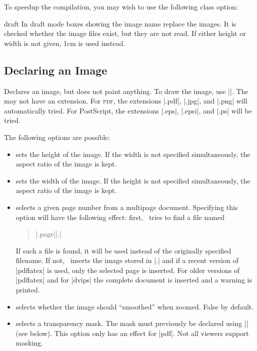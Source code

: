 To speedup the compilation, you may wish to use the following class
option:
\begin{packageoption}{draft}
  In draft mode boxes showing the image name replace the
  images. It is checked whether the image files exist, but they are
  not read. If either height or width is not given, 1cm is used
  instead. 
\end{packageoption}

\subsection{Declaring an Image}

\begin{command}{\pgfdeclareimage{}}
  Declares an image, but does not paint anything. To draw the image,
  use ||. The  may not
  have an extension.  For \textsc{pdf}, the extensions |.pdf|, |.jpg|,
  and |.png| will automatically tried. For PostScript, the extensions
  |.eps|, |.epsi|, and |.ps| will be tried. 

  The following options are possible:
  \begin{itemize}
  \item
     sets the height of the
    image. If the width is not specified simultaneously, the aspect
    ratio of the image is kept.
  \item
     sets the width of the
    image. If the height is not specified simultaneously, the aspect
    ratio of the image is kept.
  \item
     selects a given page number
    from a multipage document. Specifying this option will have the
    following effect: first, \pgfname\ tries to find a file named
    \begin{quote}
      |.page||.|
    \end{quote}
    If such a file is found, it will be used instead of the originally
    specified filename. If not, \pgfname\ inserts the image stored in
    |.| and if a recent version of
    |pdflatex| is used, only the selected page is inserted. For older
    versions of |pdflatex| and for |dvips| the complete document is
    inserted and a warning is printed.    
  \item
     selects whether the
    image should ``smoothed'' when zoomed. False by default.
  \item
     selects a transparency mask. The
    mask must previously be declared using |\pgfdeclaremask| (see
    below). This option only has an effect for |pdf|. Not all viewers
    support masking. 
  \end{itemize}


\end{command}
